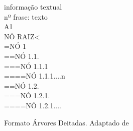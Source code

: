 \begin{figure}[!h]
    \centering
    \begin{minipage}{0.3\textwidth}
        
            informação textual\\
            nº frase: texto\\
            A1\\
            NÓ RAIZ<\\
            =NÓ 1\\
            ==NÓ 1.1.\\
            ===NÓ 1.1.1\\
            ====NÓ 1.1.1....n\\
            ==NÓ 1.2.\\
            ===NÓ 1.2.1.\\
            ====NÓ 1.2.1....\\
    \end{minipage}
        
    
    \caption[Formato Árvores Deitadas]{Formato Árvores Deitadas. Adaptado de }
    \label{fig:bosque_ad}
\end{figure}